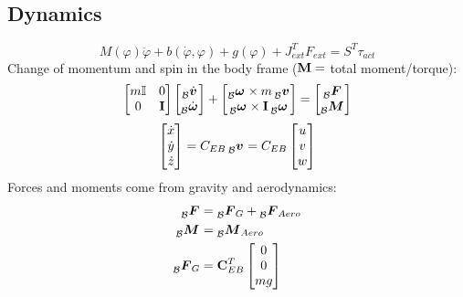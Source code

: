 \documentclass[a4paper, 8pt]{extarticle}
\newcommand{\mvec}[3]{  \prescript{}{\mathcal{#1}}{\bm{#2}}  _{#3} }
\newcommand{\mdvec}[3]{ \prescript{}{\mathcal{#1}}{\dot{\bm #2}} _{#3} }
\begin{document}
\begin{multicols*}{3}
\subsection{Dynamics}
$$\boxed{ M(\varphi)\ddot{\varphi}+b(\dot{\varphi},\varphi)+g(\varphi)+J_{ext}^T F_{ext}=S^T\tau_{act}}$$
Change of momentum and spin in the body frame (${\bf M} = $ total moment/torque):
$$\begin{bmatrix}
m\mathbb{I} & 0\\
0 & {\bf I}
\end{bmatrix}\begin{bmatrix}
\mdvec{B}{v}{} \\
\mdvec{B}{\omega}{}
\end{bmatrix} + \begin{bmatrix}
\mvec{B}{\omega}{} \times m \mvec{B}{v}{} \\
\mvec{B}{\omega}{} \times {\bf I}\mvec{B}{\omega}{}
\end{bmatrix} = \begin{bmatrix}
\mvec{B}{F}{}\\ \mvec{B}{M}{}
\end{bmatrix}
$$
$$ \begin{bmatrix} \dot{x} \\ \dot{y}\\ \dot{z} \end{bmatrix}=C_{EB} \mvec{\mathcal{B}}{v}{}=C_{EB}\begin{bmatrix} u\\ v\\ w\end{bmatrix} $$
Forces and moments come from gravity and aerodynamics:
\begin{align*}
\mvec{B}{F}{} &= \mvec{B}{F}{G} + \mvec{B}{F}{Aero} \\
\mvec{B}{M}{} &= \mvec{B}{M}{Aero} \\
\mvec{B}{F}{G} &= \mathbf{C}_{EB}^T \begin{bmatrix}
0 \\ 0 \\ mg
\end{bmatrix} \\

\end{align*}
\end{multicols*}
\end{document}
